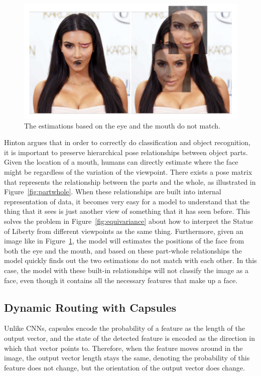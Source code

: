 \documentclass{article}
\begin{document}

\begin{figure}[!htb]
	\centering\includegraphics[width=.8\textwidth]{fig//agreement}
	\caption{The estimations based on the eye and the mouth do not match.\protect\footnotemark }\label{fig:agreement}
\end{figure}


Hinton argues that in order to correctly do classification and object recognition, it is important to preserve hierarchical pose relationships between object parts. Given the location of a mouth, humans can directly estimate where the face might be regardless of the variation of the viewpoint. There exists a pose matrix that represents the relationship between the parts and the whole, as illustrated in Figure~\ref{fig:partwhole}. When these relationships are built into internal representation of data, it becomes very easy for a model to understand that the thing that it sees is just another view of something that it has seen before. This solves the problem in Figure~\ref{fig:equivariance} about how to interpret the Statue of Liberty from different viewpoints as the same thing. Furthermore, given an image like in Figure~\ref{fig:agreement}, the model will estimates the positions of the face from both the eye and the mouth, and based on these part-whole relationships the model quickly finds out the two estimations do not match with each other. In this case, the model with these built-in relationships will not classify the image as a face, even though it contains all the necessary features that make up a face.  

\subsection{Dynamic Routing with Capsules}
Unlike CNNs, capsules encode the probability of a feature as the length of the output vector, and the state of the detected feature is encoded as the direction in which that vector points to. Therefore, when the feature moves around in the image, the output vector length stays the same, denoting the probability of this feature does not change, but the orientation of the output vector does change. 
\end{document}
